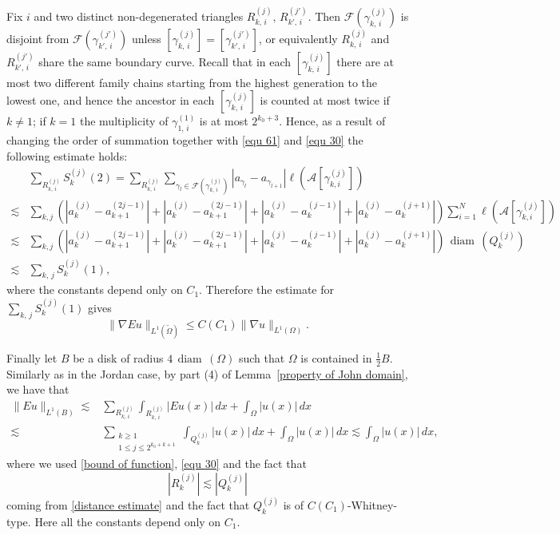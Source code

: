 \documentclass[reqno,11pt]{amsart}
\def\ls{\lesssim}
\def\diam{{\mathop\mathrm{\,diam\,}}}
\numberwithin{equation}{section}
\theoremstyle{remark}
\begin{document}
 
Fix $i$ and two distinct non-degenerated triangles $R_{k,\,i}^{(j)},\,R_{k',\,i}^{(j')}.$ Then  
$\mathcal F(\gamma_{k,\,i}^{(j)})$ is disjoint from 
$\mathcal F(\gamma_{k',\,i}^{(j')})$ unless $[\gamma_{k,\,i}^{(j)}]=[\gamma_{k',\,i}^{(j')}]$, or equivalently $R_{k,\,i}^{(j)}$ and $R_{k',\,i}^{(j')}$ share the same boundary curve. 
Recall that in each  $[\gamma_{k,\,i}^{(j)}]$ there are at most two different family chains starting from the highest generation to the lowest one, and hence the ancestor in each $[\gamma_{k,\,i}^{(j)}]$ is counted at most twice if $k\neq 1$; if $k=1$ the multiplicity of $\gamma_{1,\,i}^{(1)}$ is  at most $2^{k_0+3}$. 
Hence, as a result of changing the order of summation together with \eqref{equ 61} and \eqref{equ 30} the following estimate 
holds: 
\begin{align*}
 &\sum_{R_{k,\,i}^{(j)}} S_k^{(j)}(2) = \sum_{R_{k,\,i}^{(j)}} \sum_{\gamma_l\in \mathcal F(\gamma_{k,\,i}^{(j)})} |a_{\gamma_l} - a_{\gamma_{l+1}}|\ell(\mathcal A[\gamma_{k,i}^{(j)}])\\
 \lesssim& \sum_{k,j} (|a_k^{(j)} - a_{k+1}^{(2j-1)}|+|a_k^{(j)} - a_{k+1}^{(2j-1)}|+|a_k^{(j)} - a_{k}^{(j-1)}|+|a_k^{(j)} - a_{k}^{(j+1)}|) \sum_{i=1}^N \ell(\mathcal A[\gamma_{k,i}^{(j)}])\\
\lesssim &\sum_{k,j}(|a_k^{(j)} - a_{k+1}^{(2j-1)}|+|a_k^{(j)} - a_{k+1}^{(2j-1)}|+|a_k^{(j)} - a_{k}^{(j-1)}|+|a_k^{(j)} - a_{k}^{(j+1)}|)\diam (Q_k^{(j)})\\
\ls & \sum_{k,\,j} S^{(j)}_{k}(1),
\end{align*}
where the constants depend only on $C_1$. 
Therefore the estimate for $\sum_{k,\,j} S^{(j)}_{k}(1)$ gives
$$\|\nabla Eu\|_{L^{1}(\widetilde\Omega)} \le C(C_1) \|\nabla u\|_{L^{1}(\Omega)}. $$

Finally let $B$ be a disk of radius $4\diam(\Omega)$ such that  $\Omega$ is  contained in $\frac 1 2 B$. Similarly as in the Jordan case, by part (4) of Lemma~\ref{property of John domain}, we have that
\begin{align}\label{L1 control simply}
\| Eu\|_{L^{1}(B)}\ls & \sum_{R_{k,\,i}^{(j)}}\int_{R_{k,\,i}^{(j)}} |Eu(x)| \, dx + \int_{\Omega} |u(x)|\, dx \nonumber \\
\ls & \sum_{\substack{k\ge 1\\ 1\le j\le 2^{k_0+k+1}}}\int_{Q_k^{(j)}} |u(x)| \, dx  +\int_{\Omega} |u(x)|\, dx\ls \int_{\Omega} |u(x)|\, dx,
\end{align}
where we used \eqref{bound of function}, \eqref{equ 30} and the fact that
$$|R_k^{(j)}|\ls |Q_k^{(j)}| $$
coming from \eqref{distance estimate} and the fact that $Q_k^{(j)}$ is of $C(C_1)$-Whitney-type. Here all the constants depend only on $C_1$. 
\end{document}
